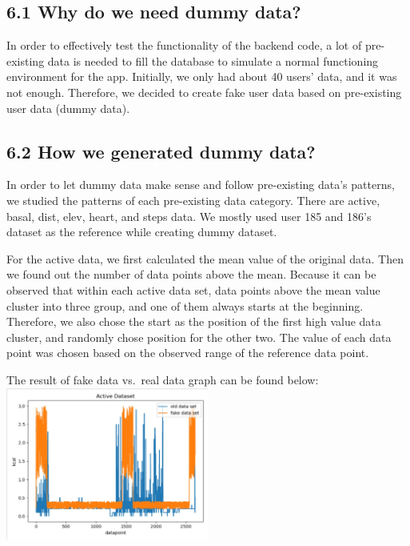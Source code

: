 \documentclass[]{book}
\begin{document}
\hypertarget{why-do-we-need-dummy-data}{%
\subsection{6.1 Why do we need dummy data?}\label{why-do-we-need-dummy-data}}

In order to effectively test the functionality of the backend code, a lot of pre-existing data is needed to fill the database to simulate a normal functioning environment for the app. Initially, we only had about 40 users' data, and it was not enough. Therefore, we decided to create fake user data based on pre-existing user data (dummy data).

\hypertarget{how-we-generated-dummy-data}{%
\subsection{6.2 How we generated dummy data?}\label{how-we-generated-dummy-data}}

In order to let dummy data make sense and follow pre-existing data's patterns, we studied the patterns of each pre-existing data category. There are active, basal, dist, elev, heart, and steps data. We mostly used user 185 and 186's dataset as the reference while creating dummy dataset.

For the active data, we first calculated the mean value of the original data. Then we found out the number of data points above the mean. Because it can be observed that within each active data set, data points above the mean value cluster into three group, and one of them always starts at the beginning. Therefore, we also chose the start as the position of the first high value data cluster, and randomly chose position for the other two. The value of each data point was chosen based on the observed range of the reference data point.

The result of fake data vs.~real data graph can be found below:\\
\includegraphics[width=0.5\textwidth,height=\textheight]{./images/Active Data.JPG}
\end{document}
